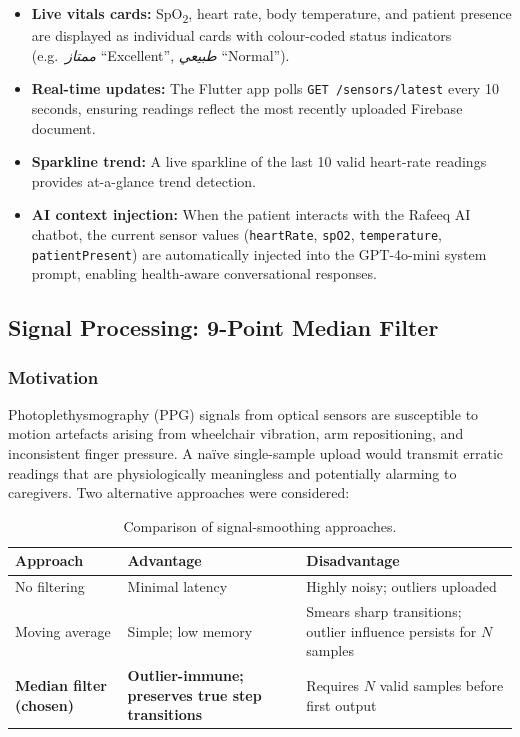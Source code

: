 \documentclass[12pt,a4paper]{report}
\begin{document}
\begin{itemize}[leftmargin=*]
  \item \textbf{Live vitals cards:} SpO\textsubscript{2}, heart rate, body temperature,
        and patient presence are displayed as individual cards with colour-coded status
        indicators (e.g.\ \textit{ممتاز} ``Excellent'', \textit{طبيعي} ``Normal'').

  \item \textbf{Real-time updates:} The Flutter app polls \texttt{GET /sensors/latest}
        every 10 seconds, ensuring readings reflect the most recently uploaded Firebase
        document.

  \item \textbf{Sparkline trend:} A live sparkline of the last 10 valid heart-rate
        readings provides at-a-glance trend detection.

  \item \textbf{AI context injection:} When the patient interacts with the Rafeeq AI
        chatbot, the current sensor values (\texttt{heartRate}, \texttt{spO2},
        \texttt{temperature}, \texttt{patientPresent}) are automatically injected into
        the GPT-4o-mini system prompt, enabling health-aware conversational responses.
\end{itemize}

\subsection{Signal Processing: 9-Point Median Filter}

\subsubsection{Motivation}

Photoplethysmography (PPG) signals from optical sensors are susceptible to motion
artefacts arising from wheelchair vibration, arm repositioning, and inconsistent finger
pressure. A naïve single-sample upload would transmit erratic readings that are
physiologically meaningless and potentially alarming to caregivers. Two alternative
approaches were considered:

\begin{table}[H]
\centering
\caption{Comparison of signal-smoothing approaches.}
\begin{tabular}{@{}p{3.5cm}p{4.5cm}p{4.5cm}@{}}
\toprule
\textbf{Approach} & \textbf{Advantage} & \textbf{Disadvantage} \\
\midrule
No filtering       & Minimal latency & Highly noisy; outliers uploaded \\
Moving average     & Simple; low memory & Smears sharp transitions; outlier influence persists for $N$ samples \\
\textbf{Median filter (chosen)} & \textbf{Outlier-immune; preserves true step transitions} & Requires $N$ valid samples before first output \\
\bottomrule
\end{tabular}
\end{table}
\end{document}
